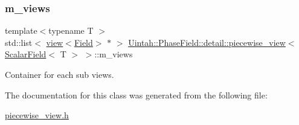 \subsubsection{\texorpdfstring{m\+\_\+views}{m\_views}}
{\footnotesize\ttfamily template$<$typename T $>$ \\
std\+::list$<$ \hyperlink{classUintah_1_1PhaseField_1_1detail_1_1view}{view}$<$\hyperlink{structUintah_1_1PhaseField_1_1ScalarField}{Field}$>$ $\ast$ $>$ \hyperlink{classUintah_1_1PhaseField_1_1detail_1_1piecewise__view}{Uintah\+::\+Phase\+Field\+::detail\+::piecewise\+\_\+view}$<$ \hyperlink{structUintah_1_1PhaseField_1_1ScalarField}{Scalar\+Field}$<$ T $>$ $>$\+::m\+\_\+views\hspace{0.3cm}{\ttfamily [protected]}}



Container for each sub views. 



The documentation for this class was generated from the following file\+:\begin{DoxyCompactItemize}
\item 
\hyperlink{piecewise__view_8h}{piecewise\+\_\+view.\+h}\end{DoxyCompactItemize}
